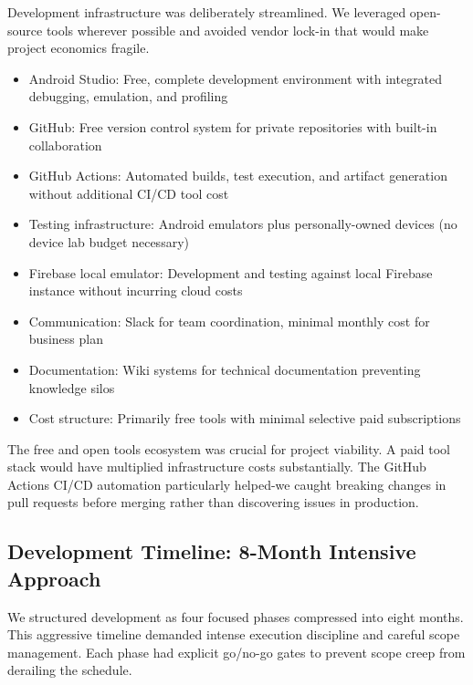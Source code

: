 \documentclass[12pt,a4paper]{report}
\begin{document}
Development infrastructure was deliberately streamlined. We leveraged open-source tools wherever possible and avoided vendor lock-in that would make project economics fragile.

\begin{itemize}
  \item Android Studio: Free, complete development environment with integrated debugging, emulation, and profiling
  \item GitHub: Free version control system for private repositories with built-in collaboration
  \item GitHub Actions: Automated builds, test execution, and artifact generation without additional CI/CD tool cost
  \item Testing infrastructure: Android emulators plus personally-owned devices (no device lab budget necessary)
  \item Firebase local emulator: Development and testing against local Firebase instance without incurring cloud costs
  \item Communication: Slack for team coordination, minimal monthly cost for business plan
  \item Documentation: Wiki systems for technical documentation preventing knowledge silos
  \item Cost structure: Primarily free tools with minimal selective paid subscriptions
\end{itemize}

The free and open tools ecosystem was crucial for project viability. A paid tool stack would have multiplied infrastructure costs substantially. The GitHub Actions CI/CD automation particularly helped-we caught breaking changes in pull requests before merging rather than discovering issues in production.

\subsection{Development Timeline: 8-Month Intensive Approach}

We structured development as four focused phases compressed into eight months. This aggressive timeline demanded intense execution discipline and careful scope management. Each phase had explicit go/no-go gates to prevent scope creep from derailing the schedule.
\end{document}
